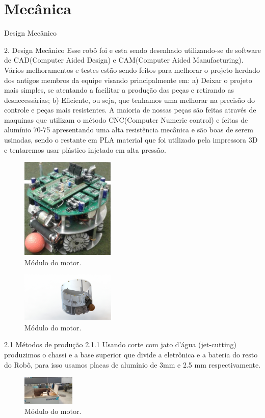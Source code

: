 \documentclass[letterpaper, 10 pt, conference]{ieeeconf}  %
\begin{document}
\section{Mecânica}

Design Mecânico

2. Design Mecânico
Esse robô foi e esta sendo desenhado utilizando-se de software de CAD(Computer Aided
Design) e CAM(Computer Aided Manufacturing). Vários melhoramentos e testes estão sendo
feitos para melhorar o projeto herdado dos antigos membros da equipe visando
principalmente em:
a) Deixar o projeto mais simples, se atentando a facilitar a produção das peças e
retirando as desnecessárias;
b) Eficiente, ou seja, que tenhamos uma melhorar na precisão do controle e peças
mais resistentes.
A maioria de nossas peças são feitas através de maquinas que utilizam o método
CNC(Computer Numeric control) e feitas de alumínio 70-75 apresentando uma alta resistência
mecânica e são boas de serem usinadas, sendo o restante em PLA material que foi utilizado
pela impressora 3D e tentaremos usar plástico injetado em alta pressão.
\begin{figure}[thpb]	
	\centering
	\includegraphics[width=4.5cm]{img/mec1}
	\caption{Módulo do motor.}
	\label{img:modulomotor}
\end{figure}
\begin{figure}[thpb]	
	\centering
	\includegraphics[width=4.5cm]{img/mec2}
	\caption{Módulo do motor.}
	\label{img:modulomotor}
\end{figure}
2.1 Métodos de produção
2.1.1 Usando corte com jato d’água (jet-cutting) produzimos o chassi e a base superior
que divide a eletrônica e a bateria do resto do Robô, para isso usamos placas de alumínio de
3mm e 2.5 mm respectivamente.
\begin{figure}[thpb]	
	\includegraphics[width=2.5cm]{img/mec3}
	\caption{Módulo do motor.}
	\label{img:modulomotor}
\end{figure}
\end{document}
